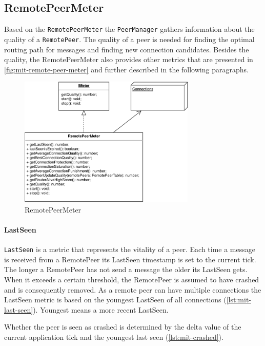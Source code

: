 \subsection{RemotePeerMeter}\label{sec:mit-peer-meter}
Based on the \lstinline|RemotePeerMeter| the \lstinline|PeerManager| gathers information about the quality of a \lstinline|RemotePeer|. The quality of a peer is needed for finding the optimal routing path for messages and finding new connection candidates.
Besides the quality, the RemotePeerMeter also provides other metrics that are presented in \vref{fig:mit-remote-peer-meter} and further described in the following paragraphs.

\begin{figure}
\centering
\includegraphics[width=0.75\textwidth]{graphics/implementation/mitosis-architecture-PeerMeter.pdf}
\caption{RemotePeerMeter}
\label{fig:mit-remote-peer-meter}
\end{figure}

\paragraph{LastSeen}
\lstinline|LastSeen| is a metric that represents the vitality of a peer. Each time a message is received from a RemotePeer its LastSeen timestamp is set to the current tick. The longer a RemotePeer has not send a message the older its LastSeen gets. When it exceeds a certain threshold, the RemotePeer is assumed to have crashed and is consequently removed.
As a remote peer can have multiple connections the LastSeen metric is based on the youngest LastSeen of all connections (\vref{lst:mit-last-seen}). Youngest means a more recent LastSeen.

Whether the peer is seen as crashed is determined by the delta value of the current application tick and the youngest last seen (\vref{lst:mit-crashed}).

